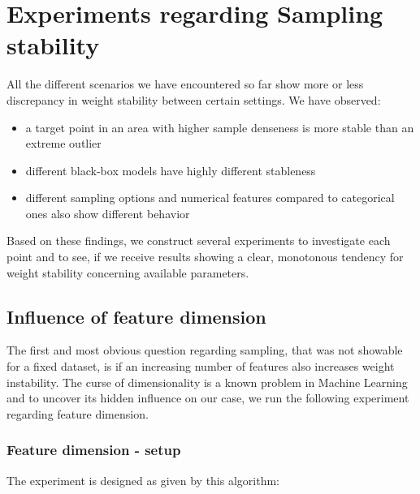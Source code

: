 \documentclass[
]{krantz}
\begin{document}
\hypertarget{experiments-regarding-sampling-stability}{%
\section{Experiments regarding Sampling stability}\label{experiments-regarding-sampling-stability}}

All the different scenarios we have encountered so far show more or less discrepancy in weight stability between certain settings.
We have observed:

\begin{itemize}
\item
  a target point in an area with higher sample denseness is more stable than an extreme outlier
\item
  different black-box models have highly different stableness
\item
  different sampling options and numerical features compared to categorical ones also show different behavior
\end{itemize}

Based on these findings, we construct several experiments to investigate each point and to see, if we receive results showing a clear, monotonous tendency for weight stability concerning available parameters.

\hypertarget{influence-of-feature-dimension}{%
\subsection{Influence of feature dimension}\label{influence-of-feature-dimension}}

The first and most obvious question regarding sampling, that was not showable for a fixed dataset, is if an increasing number of features also increases weight instability.
The curse of dimensionality is a known problem in Machine Learning and to uncover its hidden influence on our case, we run the following experiment regarding feature dimension.

\hypertarget{feature-dimension---setup}{%
\subsubsection{Feature dimension - setup}\label{feature-dimension---setup}}

The experiment is designed as given by this algorithm:
\end{document}
